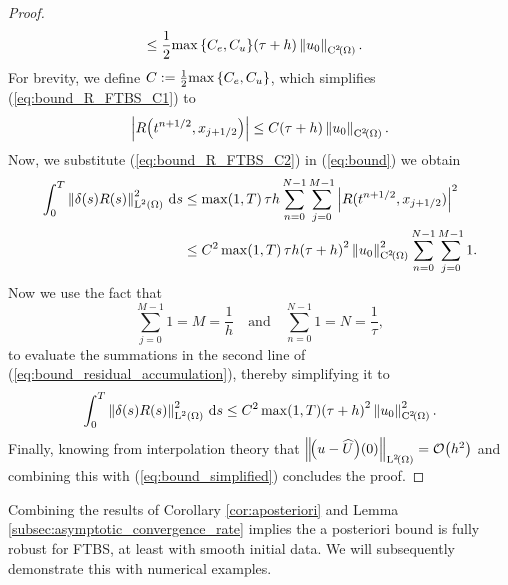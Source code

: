 \documentclass[final]{amsart}
\renewcommand{\d}{\ensuremath{\,\mathrm{d}}}
\numberwithin{equation}{section}
\begin{document}
\begin{proof}
\begin{equation}
\begin{aligned}
	&\leq 
	\frac{1}{2}
	{\max\left\lbrace C_e,C_u\right\rbrace}\!\left({\tau+h}\right)
	\left\|u_0\right\|_{\operatorname C^{2}\!\left({\Omega}\right)}.
	\end{aligned}
	\end{equation}
	For brevity, we define $C:=\frac{1}{2}{\max\left\lbrace C_e,C_u\right\rbrace}$,
	which simplifies (\ref{eq:bound_R_FTBS_C1}) to 
	\begin{equation}\label{eq:bound_R_FTBS_C2}
	\left|R\!\left({t^{n+1/2},x_{j+1/2}}\right)\right|
	\leq
	C\!\left({\tau+h}\right) \left\|u_0\right\|_{\operatorname C^{2}\!\left({\Omega}\right)}.
	\end{equation}
	Now, we substitute (\ref{eq:bound_R_FTBS_C2})  in (\ref{eq:bound}) we obtain
	\begin{equation}\label{eq:bound_residual_accumulation}
	\begin{aligned}
	\int_0^T \Norm{\delta(s) R(s)}_{\leb{2}(\W)}^2 \d s
	&\leq
	\max\qp{1,{T}}\tau h \sum_{n=0}^{N-1}
	\sum_{j=0}^{M-1} \norm{R(t^{n+1/2}, x_{j+1/2})}^2\\
	&\leq
	C^2\max\qp{1,{T}}\tau h 
	\qp{\tau+h}^2\Norm{u_0}_{\cont{2}\qp{\W}}^2
	\sum_{n=0}^{N-1}
	\sum_{j=0}^{M-1} 1.
	\end{aligned}
	\end{equation}
	Now we use the fact that
	\begin{equation}
	\sum_{j=0}^{M-1}1=M=\frac{1}{h}\quad \text{and}\quad \sum_{n=0}^{N-1}1=N=\frac{1}{\tau},
	\end{equation}
	to evaluate the summations in the second line of (\ref{eq:bound_residual_accumulation}), thereby simplifying it to
	\begin{equation}\label{eq:bound_simplified}
	\int_0^T \Norm{\delta(s) R(s)}_{\leb{2}(\W)}^2 \d s
	\leq
	C^2\max\qp{1,{T}}
	\qp{\tau+h}^2\Norm{u_0}_{\cont{2}\qp{\W}}^2.
	\end{equation}	
	Finally, knowing from interpolation theory that $\left\|\!\left({u-\widehat{U}}\right)\!\left({0}\right)\right\|_{\operatorname L^{2}\!\left({\Omega}\right)}=\mathcal{O}\!\left({h^2}\right)$ and combining this with (\ref{eq:bound_simplified}) concludes the proof.  
\end{proof}
\begin{Rem} Combining the results of Corollary \ref{cor:aposteriori}
	and Lemma \ref{subsec:asymptotic_convergence_rate} implies the a
	posteriori bound is fully robust for FTBS, at least with smooth
	initial data. We will subsequently demonstrate this with numerical
	examples.
\end{Rem}
\end{document}
